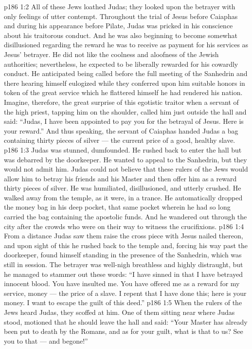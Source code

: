 \vs p186 1:2 All of these Jews loathed Judas; they looked upon the betrayer with only feelings of utter contempt. Throughout the trial of Jesus before Caiaphas and during his appearance before Pilate, Judas was pricked in his conscience about his traitorous conduct. And he was also beginning to become somewhat disillusioned regarding the reward he was to receive as payment for his services as Jesus’ betrayer. He did not like the coolness and aloofness of the Jewish authorities; nevertheless, he expected to be liberally rewarded for his cowardly conduct. He anticipated being called before the full meeting of the Sanhedrin and there hearing himself eulogized while they conferred upon him suitable honors in token of the great service which he flattered himself he had rendered his nation. Imagine, therefore, the great surprise of this egotistic traitor when a servant of the high priest, tapping him on the shoulder, called him just outside the hall and said: “Judas, I have been appointed to pay you for the betrayal of Jesus. Here is your reward.” And thus speaking, the servant of Caiaphas handed Judas a bag containing thirty pieces of silver --- the current price of a good, healthy slave.
\vs p186 1:3 Judas was stunned, dumfounded. He rushed back to enter the hall but was debarred by the doorkeeper. He wanted to appeal to the Sanhedrin, but they would not admit him. Judas could not believe that these rulers of the Jews would allow him to betray his friends and his Master and then offer him as a reward thirty pieces of silver. He was humiliated, disillusioned, and utterly crushed. He walked away from the temple, as it were, in a trance. He automatically dropped the money bag in his deep pocket, that same pocket wherein he had so long carried the bag containing the apostolic funds. And he wandered out through the city after the crowds who were on their way to witness the crucifixions.
\vs p186 1:4 From a distance Judas saw them raise the cross piece with Jesus nailed thereon, and upon sight of this he rushed back to the temple and, forcing his way past the doorkeeper, found himself standing in the presence of the Sanhedrin, which was still in session. The betrayer was well\hyp{}nigh breathless and highly distraught, but he managed to stammer out these words: “I have sinned in that I have betrayed innocent blood. You have insulted me. You have offered me as a reward for my service, money --- the price of a slave. I repent that I have done this; here is your money. I want to escape the guilt of this deed.”
\vs p186 1:5 When the rulers of the Jews heard Judas, they scoffed at him. One of them sitting near where Judas stood, motioned that he should leave the hall and said: “Your Master has already been put to death by the Romans, and as for your guilt, what is that to us? See you to that --- and begone!”
